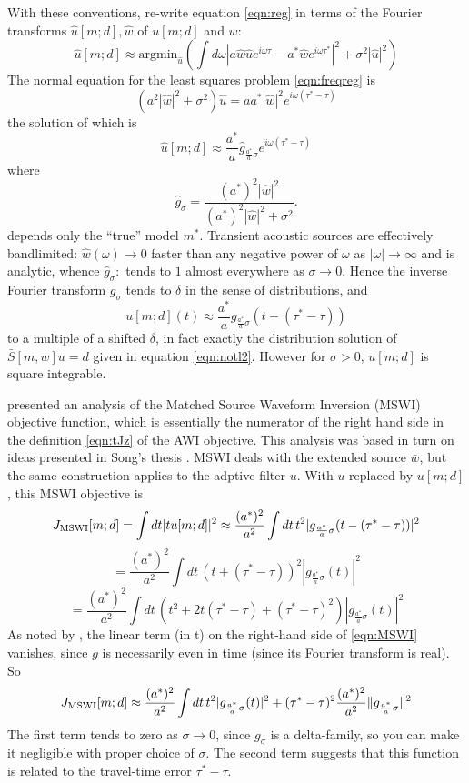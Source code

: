 With these conventions, re-write equation \ref{eqn:reg} in terms of the Fourier transforms $\hat{u}[m;d],\hat{w}$ of $u[m;d]$ and $w$:
\begin{equation}
  \label{eqn:freqreg}
\hat{u}[m;d] \approx \mbox{argmin}_{\hat{u}}\left(\int d\omega |a\hat{w}\hat{u}e^{i\omega \tau}-a^*\hat{w}e^{i\omega\tau^*}|^2 + \sigma^2 |\hat{u}|^2\right)
\end{equation}
The normal equation for the least squares problem \ref{eqn:freqreg} is
$$
(a^2 |\hat{w}|^2 +\sigma^2)\hat{u} = a a^*|\hat{w}|^2e^{i\omega(\tau^*-\tau)}
$$
the solution of which is
$$
\hat{u}[m;d] \approx \frac{a^*}{a}\hat{g}_{\frac{a^*}{a}\sigma} e^{i\omega(\tau^*-\tau)}
$$
where
$$ 
\hat{g}_{\sigma} = \frac{(a^*)^2|\hat{w}|^2}{(a^*)^2|\hat{w}|^2 + \sigma^2}.
$$
depends only the ``true'' model $m^*$. Transient acoustic sources are effectively bandlimited: $\hat{w}(\omega) \rightarrow 0$ faster than any negative power of $\omega$ as $|\omega| \rightarrow \infty$ and is analytic, whence $\hat{g}_{\sigma}:$ tends to $1$ almost everywhere as $\sigma \rightarrow 0$. Hence the inverse Fourier transform $g_{\sigma}$ tends to $\delta$ in the sense of distributions, and 
$$
u[m;d](t) \approx \frac{a^*}{a}g_{\frac{a^*}{a}\sigma}(t-(\tau^*-\tau))
$$
to a multiple of a shifted $\delta$, in fact exactly the distribution
solution of $\bar{S}[m,w]u=d$ given in equation \ref{eqn:notl2}. However for $\sigma>0$, $u[m;d]$ is square integrable.

\cite{HuangSymes2015SEG} presented an analysis of the Matched Source
Waveform Inversion (MSWI) objective function, which is essentially the
numerator of the right hand side in the definition
\ref{eqn:tJz} of the AWI objective. This analysis was based in turn on ideas presented in Song's thesis
\cite[]{Song:94c}. MSWI deals with the extended source $\bar{w}$, but
the same construction applies to the adptive filter $u$. With $u$ replaced by $u[m;d]$,  this MSWI objective is
\[
J_{\rm MSWI}[m;d] = \int dt |tu[m;d]|^2 \approx \frac{(a^*)^2}{a^2} \int dt\, t^2|g_{\frac{a^*}{a}\sigma}(t-(\tau^*-\tau))|^2
\]
\[
=\frac{(a^*)^2}{a^2} \int dt\, (t+(\tau^*-\tau))^2|g_{\frac{a^*}{a}\sigma}(t)|^2
\]
\begin{equation}
  \label{eqn:MSWI}
  =\frac{(a^*)^2}{a^2} \int dt\, (t^2 + 2t
  (\tau^*-\tau)+(\tau^*-\tau)^2)|g_{\frac{a^*}{a}\sigma}(t)|^2
\end{equation}
As noted by \cite{HuangSymes2015SEG}, the linear term (in t) on the
right-hand side of \ref{eqn:MSWI} vanishes,
since $g$ is necessarily even in time (since its Fourier transform is
real). So
\begin{equation}
  \label{eqn:MSWIasym}
  J_{\rm MSWI}[m;d] \approx
\frac{(a^*)^2}{a^2} \int dt\, t^2|g_{\frac{a^*}{a}\sigma}(t)|^2
+(\tau^*-\tau)^2\frac{(a^*)^2}{a^2}\|g_{\frac{a^*}{a}\sigma}\|^2
\end{equation}
The first term tends to zero as $\sigma \rightarrow 0$, since
$g_{\sigma}$ is a delta-family, so you can make it negligible with
proper choice of $\sigma$. The second term suggests that this function
is related to the travel-time error $\tau^*-\tau$.

